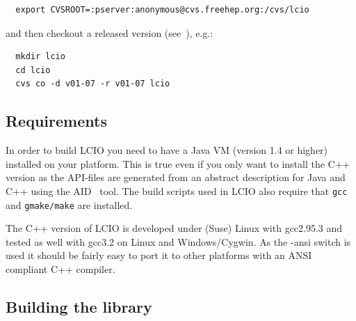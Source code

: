 \documentclass[twoside]{article}
\begin{document}
\begin{verbatim}
  export CVSROOT=:pserver:anonymous@cvs.freehep.org:/cvs/lcio
\end{verbatim}

and then checkout a released version (see~\cite{lcio_home}), e.g.:
\begin{verbatim}
  mkdir lcio 
  cd lcio
  cvs co -d v01-07 -r v01-07 lcio
\end{verbatim}

\subsection{Requirements}
In order to build LCIO you need to have a Java VM (version 1.4 or higher) installed 
on your platform. This is true even if you only want to install the C++ version as the 
API-files are generated from an abstract description for Java and C++ using the 
AID~\cite{ref_aid} tool. The build scripts used in LCIO also require that \verb$gcc$ and 
\verb$gmake/make$ are installed.

The C++ version of LCIO is developed under (Suse) Linux with gcc2.95.3 and tested
as well with gcc3.2 on Linux and Windows/Cygwin. 
As the -ansi switch is used it should be fairly easy to port it to other platforms with
an ANSI compliant C++ compiler.

\subsection {Building the library}
\end{document}
